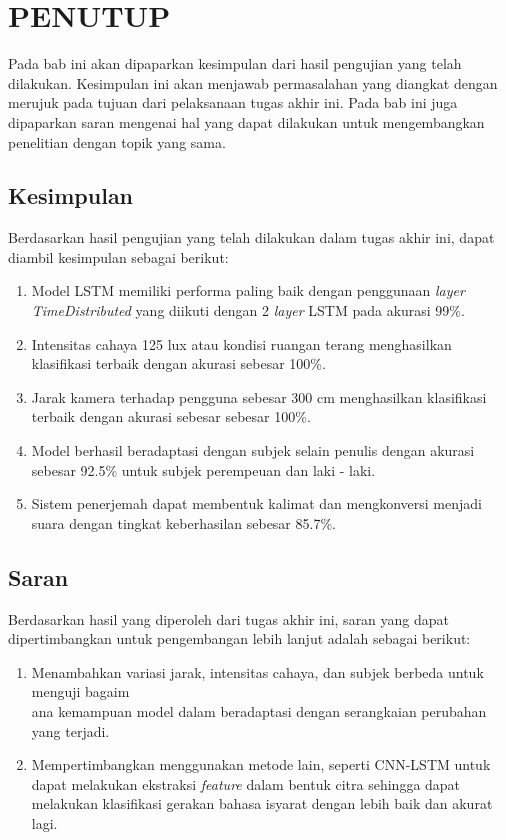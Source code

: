 \chapter{PENUTUP}
\label{chap:penutup}

Pada bab ini akan dipaparkan kesimpulan dari hasil pengujian yang telah dilakukan. Kesimpulan ini akan menjawab permasalahan yang diangkat dengan merujuk pada tujuan dari pelaksanaan tugas akhir ini. Pada bab ini juga dipaparkan saran mengenai hal yang dapat dilakukan untuk mengembangkan penelitian dengan topik yang sama.

\section{Kesimpulan}
\label{sec:kesimpulan}

Berdasarkan hasil pengujian yang telah dilakukan dalam tugas akhir ini, dapat diambil kesimpulan sebagai berikut:

\begin{enumerate}[nolistsep]

  \item Model LSTM memiliki performa paling baik dengan penggunaan \emph{layer TimeDistributed} yang diikuti dengan 2 \emph{layer} LSTM pada akurasi 99\%.
  \item Intensitas cahaya 125 lux atau kondisi ruangan terang menghasilkan klasifikasi terbaik dengan akurasi sebesar 100\%.
  \item Jarak kamera terhadap pengguna sebesar 300 cm menghasilkan klasifikasi terbaik dengan akurasi sebesar sebesar 100\%.
  \item Model berhasil beradaptasi dengan subjek selain penulis dengan akurasi sebesar 92.5\% untuk subjek perempeuan dan laki - laki.
  \item Sistem penerjemah dapat membentuk kalimat dan mengkonversi menjadi suara dengan tingkat keberhasilan sebesar 85.7\%.


\end{enumerate}

\section{Saran}
\label{chap:saran}

Berdasarkan hasil yang diperoleh dari tugas akhir ini, saran yang dapat dipertimbangkan untuk pengembangan lebih lanjut adalah sebagai berikut:

\begin{enumerate}[nolistsep]

  \item Menambahkan variasi jarak, intensitas cahaya, dan subjek berbeda untuk menguji bagaim\\ana kemampuan model dalam beradaptasi dengan serangkaian perubahan yang terjadi.
  \item Mempertimbangkan menggunakan metode lain, seperti CNN-LSTM untuk dapat melakukan ekstraksi \emph{feature} dalam bentuk citra sehingga dapat melakukan klasifikasi gerakan bahasa isyarat dengan lebih baik dan akurat lagi.

\end{enumerate}
